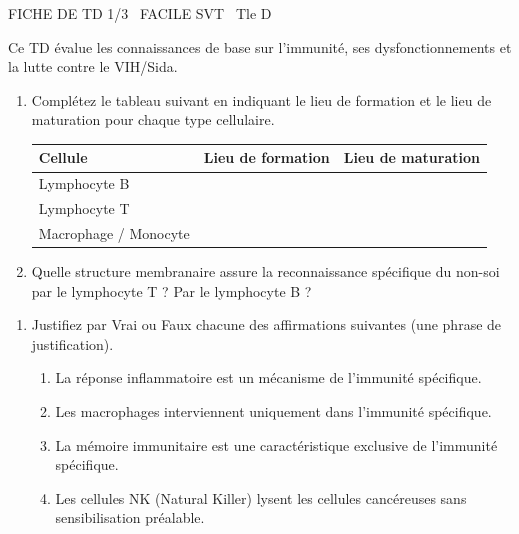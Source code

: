 \documentclass[11pt]{article}
\begin{document}
\begin{tcolorbox}[enhanced,colback=popink,colframe=popink,arc=10pt,boxrule=0pt,left=12pt,right=12pt,top=9pt,bottom=9pt]
{\color{white}\popxbold\small FICHE DE TD 1/3 \textbullet\ FACILE \hfill SVT \textbullet\ Tle D\par}
\end{tcolorbox}
\vspace{4pt}
Ce TD évalue les connaissances de base sur l'immunité, ses dysfonctionnements et la lutte contre le VIH/Sida.

\begin{exercice}
\begin{enumerate}
    \item Complétez le tableau suivant en indiquant le lieu de formation et le lieu de maturation pour chaque type cellulaire.
    \begin{tabular}{|l|c|c|}
    \hline
    \textbf{Cellule} & \textbf{Lieu de formation} & \textbf{Lieu de maturation} \\
    \hline
    Lymphocyte B & & \\
    \hline
    Lymphocyte T & & \\
    \hline
    Macrophage / Monocyte & & \\
    \hline
    \end{tabular}
    \item Quelle structure membranaire assure la reconnaissance spécifique du non-soi par le lymphocyte T ? Par le lymphocyte B ?
\end{enumerate}
\end{exercice}

\begin{exercice}
\begin{enumerate}
    \item Justifiez par \og Vrai \fg{} ou \og Faux \fg{} chacune des affirmations suivantes (une phrase de justification).
    \begin{enumerate}
        \item La réponse inflammatoire est un mécanisme de l'immunité spécifique.
        \item Les macrophages interviennent uniquement dans l'immunité spécifique.
        \item La mémoire immunitaire est une caractéristique exclusive de l'immunité spécifique.
        \item Les cellules NK (Natural Killer) lysent les cellules cancéreuses sans sensibilisation préalable.
    \end{enumerate}
\end{enumerate}
\end{exercice}
\end{document}
